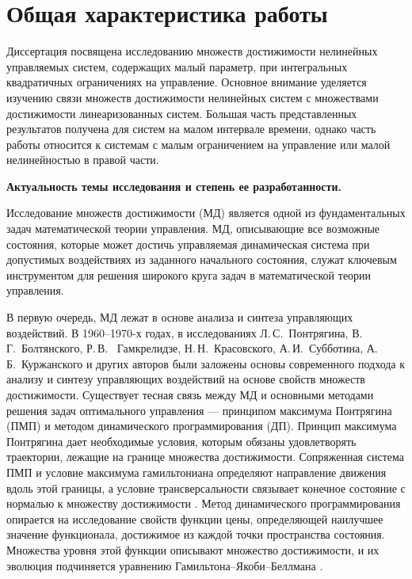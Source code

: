 \documentclass[../main.tex]{subfiles}
\begin{document}
\clearpage
\section*{Общая характеристика работы}
Диссертация посвящена исследованию множеств достижимости нелинейных управляемых систем, содержащих малый параметр, при интегральных квадратичных ограничениях на управление.
Основное внимание уделяется изучению связи множеств достижимости нелинейных систем с множествами достижимости линеаризованных систем. 
Большая часть представленных результатов получена для систем на малом интервале времени, однако часть работы относится к системам с малым ограничением на управление или малой нелинейностью в правой части. 

\textbf{Актуальность темы исследования и степень ее разработанности.} 

Исследование множеств достижимости (МД) является одной из фундаментальных задач математической теории управления. 
МД, описывающие все возможные состояния, которые может достичь управляемая динамическая система при допустимых воздействиях из заданного начального состояния, служат ключевым инструментом для решения широкого круга задач в математической теории управления. 

В первую очередь, МД лежат в основе анализа и синтеза управляющих воздействий. 
В 1960–1970-х годах, в исследованиях Л.\,С.~Понтрягина, В.\,Г.~Болтянского, Р.\,В. ~Гамкрелидзе, Н.\,Н.~Красовского, А.\,И.~Субботина, А.\,Б.~Куржанского и других авторов \cite{Boltyansky, Pontryagin1961, Pontryagin1967, Gamkrelidze, Kras_book, KrasSub, Kurzhanski1977} были заложены основы современного подхода к анализу и синтезу управляющих воздействий на основе свойств множеств достижимости.
Существует тесная связь между МД и основными методами решения задач оптимального управления --- принципом максимума Понтрягина (ПМП) и методом динамического программирования (ДП).
Принцип максимума Понтрягина дает необходимые условия, которым обязаны удовлетворять траектории, лежащие на границе множества достижимости. 
Сопряженная система ПМП и условие максимума гамильтониана определяют направление движения вдоль этой границы, а условие трансверсальности связывает конечное состояние с нормалью к множеству достижимости \cite{Pontryagin1961, Lee}.
Метод динамического программирования опирается на исследование свойств функции цены, определяющей наилучшее значение функционала, достижимое из каждой точки пространства состояния. 
Множества уровня этой функции описывают множество достижимости, и их эволюция подчиняется уравнению Гамильтона–Якоби–Беллмана \cite{Bellman, Kurzhanski1977, GurmanDuhta, Mitchell2002, Osher, Sethian}. 
\end{document}
